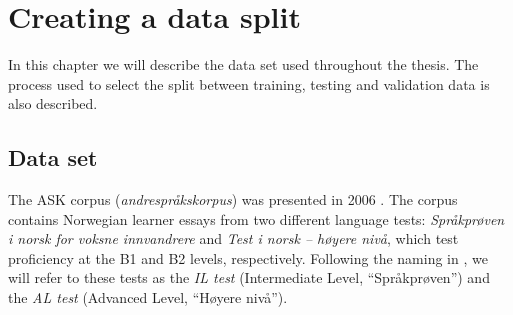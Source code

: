 \chapter{Creating a data split}

In this chapter we will describe the data set used throughout the thesis. The
process used to select the split between training, testing and validation
data is also described.

\section{Data set}

The ASK corpus (\emph{andrespråkskorpus}) was presented in 2006
\autocite{tenfjord06}. The corpus contains Norwegian learner essays from two
different language tests: \emph{Språkprøven i norsk for voksne innvandrere}
and \emph{Test i norsk – høyere nivå}, which test proficiency at the B1 and
B2 levels, respectively. Following the naming in
\textcite{carlsen2012proficiency}, we will refer to these tests as the
\emph{IL test} (Intermediate Level, ``Språkprøven'') and the \emph{AL test}
(Advanced Level, ``Høyere nivå'').

